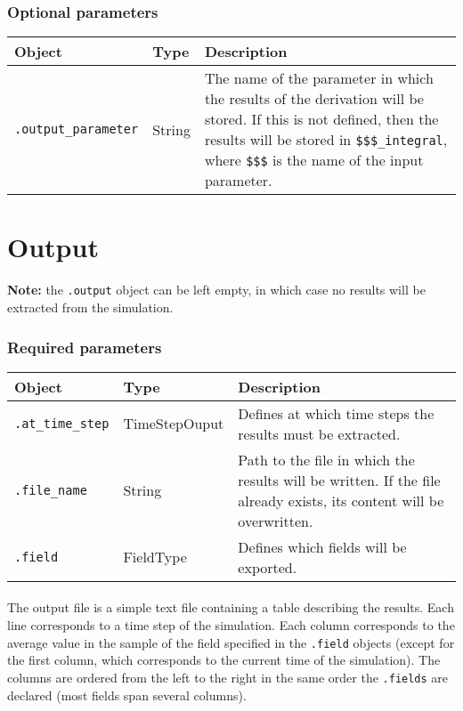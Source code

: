 \documentclass[10pt]{article}
\begin{document}
\subsubsection*{Optional parameters}

\begin{tabularx}{\textwidth}{llX}
\hline 
Object & Type & Description \\ 
\hline 
\verb+.output_parameter+ & String & The name of the parameter in which the results of the derivation will be stored. If this is not defined, then the results will be stored in \verb+$$$_integral+, where \verb+$$$+ is the name of the input parameter.\\
\hline 
\end{tabularx}

\section{Output}

\textbf{Note:} the \verb+.output+ object can be left empty, in which case no results will be extracted from the simulation.

\subsubsection*{Required parameters}

\begin{tabularx}{\textwidth}{llX}
\hline 
Object & Type & Description \\ 
\hline 
\verb+.at_time_step+ & TimeStepOuput & Defines at which time steps the results must be extracted. \\ 
\verb+.file_name+ & String & Path to the file in which the results will be written. If the file already exists, its content will be overwritten.\\ 
\verb+.field+ & FieldType & Defines which fields will be exported.\\
\hline 
\end{tabularx}

\paragraph{} The output file is a simple text file containing a table describing the results. Each line corresponds to a time step of the simulation. Each column corresponds to the average value in the sample of the field specified in the \verb+.field+ objects (except for the first column, which corresponds to the current time of the simulation). The columns are ordered from the left to the right in the same order the \verb+.fields+ are declared (most fields span several columns).
\end{document}
